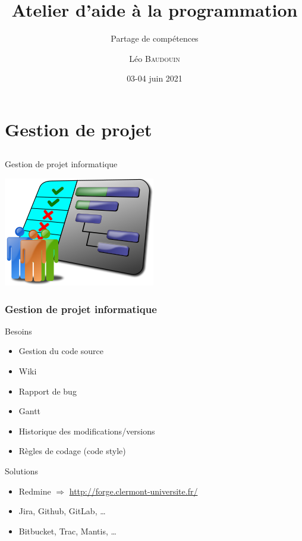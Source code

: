 \documentclass{beamer}
\title{Atelier d'aide à la programmation}
\subtitle{Partage de compétences}
\author{L\'eo \textsc{Baudouin}}
\institute{
  {\url{baudouin.leo @ gmail.com}}
}
\date{03-04 juin 2021}
\begin{document}
\begin{frame}
  \titlepage
\end{frame}




\section{Gestion de projet}
\subsection{}

\begin{frame}{Gestion de projet informatique}
\begin{center}
\includegraphics[width=0.5\linewidth]{images/project}

\end{center}
\end{frame}


\begin{frame}
  \frametitle{Gestion de projet informatique}
  \begin{block}{Besoins}
  \begin{itemize}
  \item Gestion du code source
  \item Wiki
  \item Rapport de bug
  \item Gantt
  \item Historique des modifications/versions
  \item Règles de codage (code style)
  \end{itemize}
  \end{block}
\pause
	\begin{exampleblock}{Solutions}
	\begin{itemize}
	\item Redmine $\Rightarrow$ \url{http://forge.clermont-universite.fr/}
	\item Jira, Github, GitLab, \dots
	\item Bitbucket, Trac, Mantis, \dots
	\end{itemize}
	\end{exampleblock}  
  
\end{frame}
\end{document}
